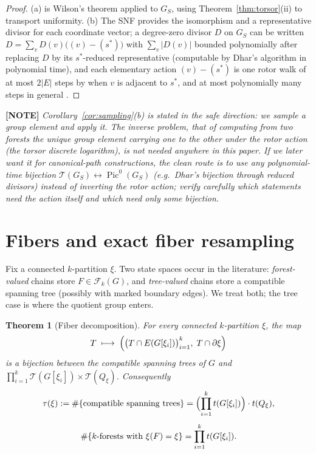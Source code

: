 \documentclass[11pt]{article}
\newcommand{\statusnote}[1]{\medskip\noindent\textcolor{notecol}{\textbf{[NOTE]} \emph{#1}}\medskip}
\newcommand{\PicO}[1]{\operatorname{Pic}^0(#1)}
\newcommand{\Tcal}{\mathcal{T}}
\newcommand{\Fcal}{\mathcal{F}}
\newtheorem{theorem}{Theorem}[section]
\begin{document}
\begin{proof}
(a) is Wilson's theorem applied to $G_S$, using
Theorem~\ref{thm:torsor}(ii) to transport uniformity. (b) The SNF provides
the isomorphism and a representative divisor for each coordinate vector; a
degree-zero divisor $D$ on $G_S$ can be written $D = \sum_v D(v) \bigl((v) -
(s^*)\bigr)$ with $\sum_v |D(v)|$ bounded polynomially after replacing $D$
by its $s^*$-reduced representative (computable by Dhar's algorithm in
polynomial time), and each elementary action $(v) - (s^*)$ is one rotor walk
of at most $2|E|$ steps by \cite[Prop.~3.3]{ganguly2023rotor} when $v$ is
adjacent to $s^*$, and at most polynomially many steps in general
\cite{holroyd2008chip}.
\end{proof}

\statusnote{Corollary~\ref{cor:sampling}(b) is stated in the safe direction:
we sample a group element and \emph{apply} it. The inverse problem, that of computing from two forests the unique group
element carrying one to the other under the rotor action (the torsor discrete
logarithm), is not needed
anywhere in this paper. If we later want it for canonical-path
constructions, the clean route is to use any polynomial-time bijection
$\Tcal(G_S) \leftrightarrow \PicO{G_S}$ (e.g.\ Dhar's bijection through
reduced divisors) instead of inverting the rotor action; verify carefully
which statements need the action itself and which need only \emph{some}
bijection.}

\section{Fibers and exact fiber resampling}
\label{sec:fiber}

Fix a connected $k$-partition $\xi$. Two state spaces occur in the
literature: \emph{forest-valued} chains store $F \in \Fcal_k(G)$, and
\emph{tree-valued} chains store a compatible spanning tree (possibly with
marked boundary edges). We treat both; the tree case is where the quotient
group enters.

\begin{theorem}[Fiber decomposition]
\label{thm:fiber-decomp}
For every connected $k$-partition $\xi$, the map
\[
  T \;\longmapsto\;
  \Bigl( \bigl(T \cap E(G[\xi_i])\bigr)_{i=1}^{k},\;
         T \cap \partial\xi \Bigr)
\]
is a bijection between the compatible spanning trees of $G$ and
$\prod_{i=1}^k \Tcal(G[\xi_i]) \times \Tcal(Q_\xi)$. Consequently
\[
\begin{gathered}
  \tau(\xi) := \#\{\text{compatible spanning trees}\}
   = \Bigl(\prod_{i=1}^{k} t(G[\xi_i])\Bigr) \cdot t(Q_\xi), \\[4pt]
  \#\{\text{$k$-forests with } \xi(F) = \xi\} = \prod_{i=1}^{k} t(G[\xi_i]).
\end{gathered}
\]
\end{theorem}
\end{document}
